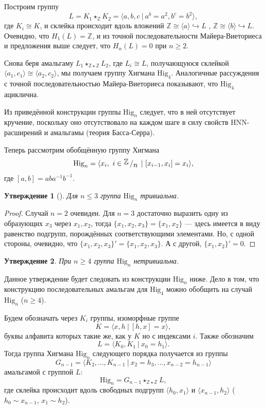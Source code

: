 \documentclass[14pt, dvipsnames]{extarticle}
\newtheorem{statement}{Утверждение}
\theoremstyle{definition}
\theoremstyle{remark}
\newcommand{\factor}[2]{{\raisebox{.2em}{$#1$}\left/\raisebox{-.2em}{$#2$}\right.}}
\begin{document}
Построим группу $$L= K_1\star_{\mathbb{Z}} K_2=\langle a, b, c\ |\  a^b=a^2, b^c=b^2 \rangle,$$ где $K_i\cong K$, и склейка происходит вдоль вложений $\mathbb{Z}\cong \langle a \rangle\hookrightarrow L$ , $\mathbb{Z}\cong\langle b \rangle\hookrightarrow L$. Очевидно, что $H_1(L)=\mathbb{Z}$, и из точной последовательности Майера-Виеториеса и предложения выше следует, что $H_n(L)=0$ при $n\geqslant 2$.

Снова беря амальгаму $L_1\star_{\mathbb{Z}\star\mathbb{Z}} L_2$, где $L_i\cong L$, получающуюся склейкой $\langle a_1, c_1 \rangle \cong \langle a_2, c_2 \rangle$, мы получаем группу Хигмана $\mathrm{Hig}_4$. Аналогичные рассуждения с точной последовательностью Майера-Виеториеса показывают, что $\mathrm{Hig}_4$ ациклична.

Из приведённой конструкции группы $\mathrm{Hig}_n$ следует, что в ней отсутствует кручение, поскольку оно отсутствовало на каждом шаге в силу свойств HNN-расширений и амальгамы (теория Басса-Серра). 




Теперь рассмотрим обобщённую группу Хигмана $$\mathrm{Hig}_n=\langle x_i, \ i\in \factor{\mathbb{Z}}{n}\ | \ [x_{i-1}, x_i]=x_i \rangle,$$ где $[a, b]=aba^{-1}b^{-1}$.

\begin{statement}[\cite{Higman}]
Для $n\leqslant 3$ группа $\mathrm{Hig}_n$ тривиальна.
\end{statement}

\begin{proof}
Случай $n=2$ очевиден. Для $n=3$ достаточно выразить одну из образующих $x_3$ через $x_1, x_2$, тогда $\{x_1, x_2, x_3 \}=\{x_1, x_2\}$ --- здесь имеется в виду равенство подгрупп, порождённых соответствующими элементами. Но, с одной стороны, очевидно, что $\{x_1, x_2, x_3 \}'=\{x_1, x_2, x_3 \}$. А с другой, $\{x_1, x_2\}'=0$.
\end{proof}

\begin{statement}
При $n\geqslant 4$ группа $\mathrm{Hig}_n$ нетривиальна.
\end{statement}

Данное утверждение будет следовать из конструкции $\mathrm{Hig}_n$ ниже. Дело в том, что конструкцию последовательных амальгам для $\mathrm{Hig}_4$ можно обобщить на случай $\mathrm{Hig}_n$ ($n\geqslant 4$).

Будем обозначать через $K_i$ группы, изоморфные группе $$K=\langle x, h\ |\ [h, x]=x \rangle,$$ буквы алфавита которых такие же, как у $K$ но с индексами $i$. Также обозначим $$L=\langle K_0, K_1\ |\ x_0=h_1 \rangle.$$ Тогда группа Хигмана $\mathrm{Hig}_n$ следующего порядка получается из группы $$G_{n-1}=\langle K_2, ..., K_{n-1}\ |\ x_2=h_3, ..., x_{n-2}=h_{n-1}\rangle$$ амальгамой с группой $L$: $$\mathrm{Hig}_n=G_{n-1}\star_{\mathbb{Z}\star\mathbb{Z}}L,$$ где склейка происходит вдоль свободных подгрупп $\langle h_0, x_1 \rangle$ и $\langle x_{n-1}, h_2 \rangle$ ($h_0\sim x_{n-1}$, $x_1\sim h_2$). 
\end{document}

